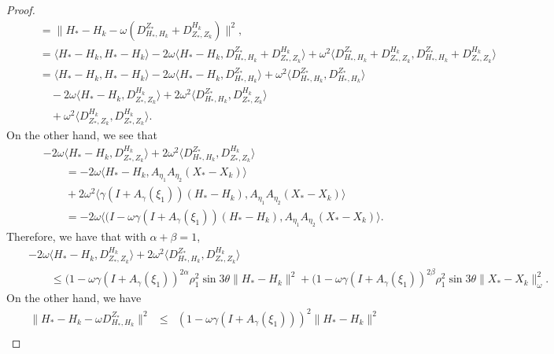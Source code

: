 \begin{itemize}
\begin{proof}
\begin{eqnarray*}
&& \quad = \|H_* - H_k - \omega (D_{H_*,H_k}^{Z_*} + D_{Z_*,Z_k}^{H_k})\|^2,  \\
&& \quad = \langle H_* - H_k, H_* - H_k \rangle - 2 \omega \langle H_* - H_k, D_{H_*,H_k}^{Z_*} + D_{Z_*,Z_k}^{H_k} \rangle + \omega^2 \langle  D_{H_*,H_k}^{Z_*} + D_{Z_*,Z_k}^{H_k},  D_{H_*,H_k}^{Z_*} + D_{Z_*,Z_k}^{H_k}\rangle \\ 
&& \quad = \langle H_* - H_k, H_* - H_k \rangle - 2 \omega \langle H_* - H_k, D_{H_*,H_k}^{Z_*} \rangle + \omega^2 \langle D_{H_*,H_k}^{Z_*}, D_{H_*,H_k}^{Z_*}\rangle \\ 
&& \qquad - 2 \omega \langle H_* - H_k, D_{Z_*,Z_k}^{H_k} \rangle + 2 \omega^2 \langle  
D_{H_*,H_k}^{Z_*}, D_{Z_*,Z_k}^{H_k} \rangle \\
&& \qquad + \omega^2 \langle D_{Z_*,Z_k}^{H_k},  D_{Z_*,Z_k}^{H_k} \rangle. 
\end{eqnarray*}
On the other hand, we see that 
\begin{eqnarray*}
&& -2\omega \langle H_* - H_k, D_{Z_*,Z_k}^{H_k} \rangle + 2\omega^2 \langle D_{H_*,H_k}^{Z_*}, D_{Z_*,Z_k}^{H_k}  \rangle \\
&& \qquad = -2\omega \langle H_* - H_k, A_{\eta_1} A_{\eta_2} (X_*  - X_k) \rangle \\ 
&& \qquad + 2 \omega^2 \langle \gamma (I + A_\gamma (\xi_1)) (H_* - H_k), A_{\eta_1} A_{\eta_2} (X_*  - X_k)  \rangle \\
&& \qquad = - 2\omega \langle (I - \omega \gamma (I + A_\gamma(\xi_1))(H_* - H_k), A_{\eta_1} A_{\eta_2} (X_*  - X_k) \rangle. 
\end{eqnarray*}
Therefore, we have that with $\alpha + \beta = 1$, 
\begin{eqnarray*}
&& -2\omega \langle H_* - H_k, D_{Z_*,Z_k}^{H_k} \rangle + 2\omega^2 \langle D_{H_*,H_k}^{Z_*}, D_{Z_*,Z_k}^{H_k}  \rangle \\
&& \qquad \leq (1 - \omega \gamma (I + A_\gamma(\xi_1))^{2\alpha} \rho_1^2 \sin 3 \theta \|H_* - H_k\|^2 + (1 - \omega \gamma (I +  A_\gamma(\xi_1))^{2\beta} \rho_1^2 \sin 3 \theta \|X_* - X_k\|_\omega^2. 
\end{eqnarray*}
On the other hand, we have 
\begin{eqnarray*}
\|H_* - H_k - \omega D_{H_*,H_k}^{Z_*} \|^2 &\leq& 
(1 - \omega \gamma (I + A_\gamma(\xi_1)))^2 \|H_* - H_k\|^2 \\ 

\end{eqnarray*}
\end{proof}
\end{itemize}
